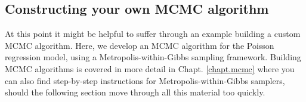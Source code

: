 {%



\subsection{ Constructing your own MCMC algorithm}
\label{GLMM.sect.mcmc}

At this point it might be helpful to suffer through an example
building a custom MCMC algorithm. Here, we develop an MCMC algorithm
for the Poisson regression model, using a Metropolis-within-Gibbs
sampling framework.  Building MCMC algorithms is covered in more
detail in Chapt. \ref{chapt.mcmc} where you can also find step-by-step
instructions for Metropolis-within-Gibbs samplers, should the
following section move through all this material too quickly.

}
